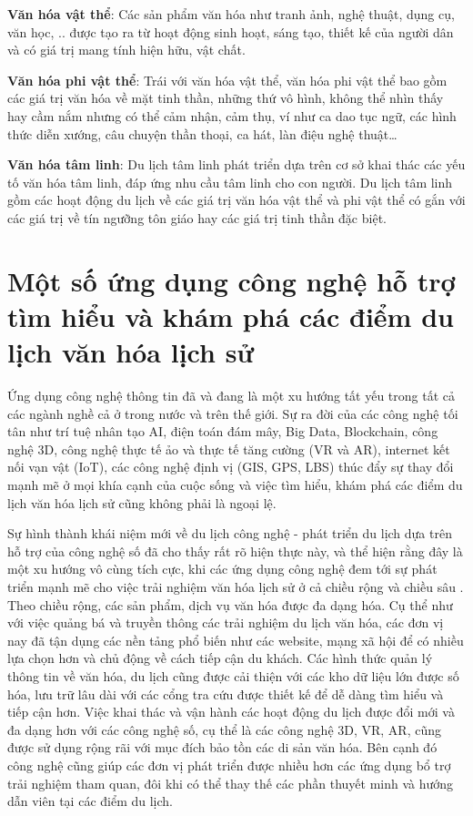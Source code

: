 \textbf{Văn hóa vật thể}: Các sản phẩm văn hóa như tranh ảnh, nghệ thuật, dụng cụ,
văn học, .. được tạo ra từ hoạt động sinh hoạt, sáng tạo, thiết kế của người dân và có
giá trị mang tính hiện hữu, vật chất.

\textbf{Văn hóa phi vật thể}: Trái với văn hóa vật thể, văn hóa phi vật thể bao gồm các
giá trị văn hóa về mặt tinh thần, những thứ vô hình, không thể nhìn thấy hay cầm nắm
nhưng có thể cảm nhận, cảm thụ, ví như ca dao tục ngữ, các hình thức diễn xướng,
câu chuyện thần thoại, ca hát, làn điệu nghệ thuật…

\textbf{Văn hóa tâm linh}: Du lịch tâm linh phát triển dựa trên cơ sở khai thác các yếu
tố văn hóa tâm linh, đáp ứng nhu cầu tâm linh cho con người. Du lịch tâm linh gồm
các hoạt động du lịch về các giá trị văn hóa vật thể và phi vật thể có gắn với các giá
trị về tín ngưỡng tôn giáo hay các giá trị tinh thần đặc biệt.

\section{Một số ứng dụng công nghệ hỗ trợ tìm hiểu và khám phá các điểm du lịch
văn hóa lịch sử}
Ứng dụng công nghệ thông tin đã và đang là một xu hướng tất yếu\cite{itdr2022} trong tất
cả các ngành nghề cả ở trong nước và trên thế giới. Sự ra đời của các công nghệ tối
tân như trí tuệ nhân tạo AI, điện toán đám mây, Big Data, Blockchain, công nghệ 3D,
công nghệ thực tế ảo và thực tế tăng cường (VR và AR), internet kết nối vạn vật (IoT),
các công nghệ định vị (GIS, GPS, LBS) thúc đẩy sự thay đổi mạnh mẽ ở mọi khía
cạnh của cuộc sống và việc tìm hiểu, khám phá các điểm du lịch văn hóa lịch sử cũng
không phải là ngoại lệ.

Sự hình thành khái niệm mới về du lịch công nghệ - phát triển du lịch dựa trên
hỗ trợ của công nghệ số \cite{traveloka2022} đã cho thấy rất rõ hiện thực này, và thể hiện rằng đây là
một xu hướng vô cùng tích cực, khi các ứng dụng công nghệ đem tới sự phát triển
mạnh mẽ cho việc trải nghiệm văn hóa lịch sử ở cả chiều rộng và chiều sâu \cite{tapchicongthuong2022}. Theo
chiều rộng, các sản phẩm, dịch vụ văn hóa được đa dạng hóa. Cụ thể như với việc
quảng bá và truyền thông các trải nghiệm du lịch văn hóa, các đơn vị nay đã tận dụng
các nền tảng phổ biến như các website, mạng xã hội để có nhiều lựa chọn hơn và chủ
động về cách tiếp cận du khách. Các hình thức quản lý thông tin về văn hóa, du lịch
cũng được cải thiện với các kho dữ liệu lớn được số hóa, lưu trữ lâu dài với các cổng
tra cứu được thiết kế để dễ dàng tìm hiểu và tiếp cận hơn. Việc khai thác và vận hành
các hoạt động du lịch được đổi mới và đa dạng hơn với các công nghệ số, cụ thể là
các công nghệ 3D, VR, AR, cũng được sử dụng rộng rãi với mục đích bảo tồn các di
sản văn hóa. Bên cạnh đó công nghệ cũng giúp các đơn vị phát triển được nhiều hơn các ứng dụng bổ trợ trải nghiệm tham quan, đôi khi có thể thay thế các phần thuyết
minh và hướng dẫn viên tại các điểm du lịch.

